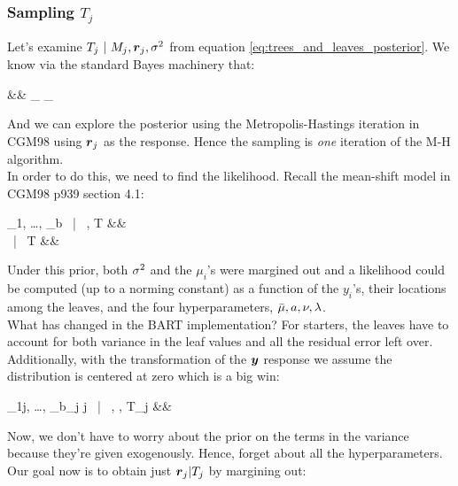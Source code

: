 \documentclass[12pt]{article}
\begin{document}

\subsubsection{Sampling $T_j$}

Let's examine $T_j ~|~ M_j, \boldsymbol{r}_j, \sigma^2$ from equation \ref{eq:trees_and_leaves_posterior}. We know via the standard Bayes machinery that:

\beqn
{} &\propto& _{} _{} \\
\eeqn

And we can explore the posterior using the Metropolis-Hastings iteration in CGM98 using $\boldsymbol{r}_j$ as the response. Hence the sampling is \textit{one} iteration of the M-H algorithm.\\

In order to do this, we need to find the likelihood. Recall the mean-shift model in CGM98 p939 section 4.1:

\beqn
\mu_1, \ldots, \mu_b ~|~ \sigsq, T &\iid&  \\
\sigsq ~|~ T &\iid& \invgammanot{\overtwo{\nu}}{\overtwo{\nu\lambda}}
\eeqn

Under this prior, both $\sigma^2$ and the $\mu_i$'s were margined out and a likelihood could be computed (up to a norming constant) as a function of the $y_i$'s, their locations among the leaves, and the four hyperparameters, $\bar{\mu}, a, \nu, \lambda$.\\

What has changed in the BART implementation? For starters, the leaves have to account for both variance in the leaf values and all the residual error left over. Additionally, with the transformation of the $\boldsymbol{y}$ response we assume the distribution is centered at zero which is a big win:

\beqn
\mu_{1j}, \ldots, \mu_{b_j j} ~|~ \sigsq, \sigsqmu, T_j &\iid&  \\
\eeqn

Now, we don't have to worry about the prior on the terms in the variance because they're given exogenously. Hence, forget about all the hyperparameters. Our goal now is to obtain just $\boldsymbol{r}_j | T_j$ by margining out:
\end{document}
